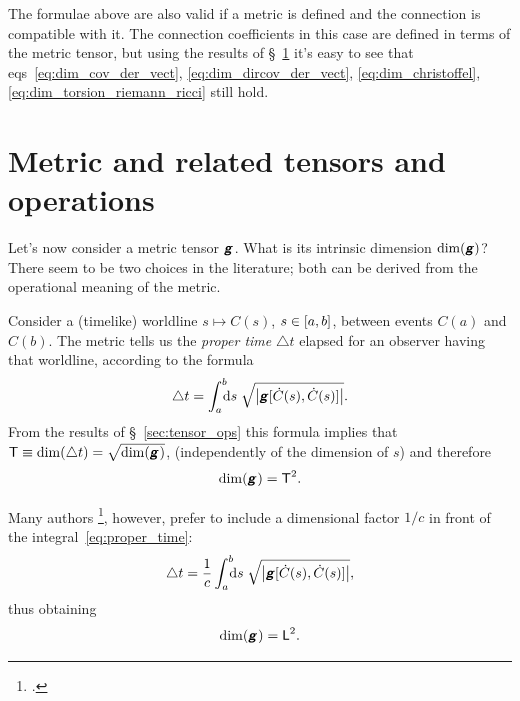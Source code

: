 \documentclass[\ifafour a4paper,12pt,\else a5paper,10pt,\fi%
onecolumn,oneside,article,%
british%
]{memoir}
\makeatletter
\theoremstyle{remark}
\theoremstyle{innote}
\newcommand*{\mathte}[1]{\textbf{\textit{\textsf{#1}}}}
\newcommand*{\citep}{\footcites}
\newcommand*{\di}{\mathrm{d}}%
\newcommand*{\incr}{\triangle}%
\DeclarePairedDelimiter\clcl{[}{]}
\DeclarePairedDelimiter\abs{\lvert}{\rvert}
\renewcommand*{\|}[1][]{\nonscript\,#1\vert\nonscript\;\mathopen{}}
\newcommand*{\sect}{\S}%
\newcommand*{\chap}{ch.}%
\newcommand*{\eqn}{eq.}%
\newcommand*{\eqns}{eqs}%
\newcommand*{\eg}{{e.g.}}
\newcommand*{\q}{}%
\DeclareRobustCommand*{\q}{%
  \mathbin{\mathpalette\bigcdot@{}}%
}
\newcommand*{\bigcdot@scalefactor}{0.75}
\newcommand*{\bigcdot@widthfactor}{1.5}
\newcommand*{\bigcdot@}[2]{%
  \sbox0{$#1\vcenter{}$}%
  \sbox2{$#1\cdot\m@th$}%
  \hbox to \bigcdot@widthfactor\wd2{%
    \hfil
    \raise\ht0\hbox{%
      \scalebox{\bigcdot@scalefactor}{%
        \lower\ht0\hbox{$#1\bullet\m@th$}%
      }%
    }%
    \hfil
  }%
}
\newcommand*{\Le}{\textsf{L}}
\newcommand*{\Ti}{\textsf{T}}
\newcommand*{\yg}{\mathte{g}}
\newcommand*{\ygc}{\mathte{g}}
\renewcommand*{\i}{\indices}
\newcommand*{\inct}{\incr t}
\makeatother
\begin{document}
\medskip

The formulae above are also valid if a metric is defined and the connection
is compatible with it. The connection coefficients in this case are defined
in terms of the metric tensor, but using the results of
\sect~\ref{sec:metric} it's easy to see that
\eqns~\eqref{eq:dim_cov_der_vect}, \eqref{eq:dim_dircov_der_vect},
\eqref{eq:dim_christoffel}, \eqref{eq:dim_torsion_riemann_ricci} still
hold.


\section{Metric and related tensors and operations}
\label{sec:metric}

Let's now consider a metric tensor $\yg\i{_{\q\q}}$. What is its intrinsic
dimension $\dim(\yg)$? There seem to be two choices in the literature; both
can be derived from the operational meaning of the metric.


Consider a (timelike) worldline $s \mapsto C(s)$, $s\in \clcl{a,b}$,
between events $C(a)$ and $C(b)$. The metric tells us the \emph{proper
  time} $\inct$ elapsed for an observer having that worldline, according to
the formula
\begin{equation}%
  \label{eq:proper_time}
\inct =  \int_a^b\!\!\!\di s\;
\sqrt{\abs*{\yg[\dot{C}(s),\dot{C}(s)]}}.
\end{equation}
From the results of \sect~\ref{sec:tensor_ops} this formula implies that
 $\Ti \equiv \dim(\inct) = \sqrt{\dim(\yg\i{_{\q\q}})}$,
(independently of the dimension of $s$) and therefore
\begin{equation}%
    \label{eq:dim_g}
    \dim(\yg\i{_{\q\q}}) = \Ti^{2}.
  \end{equation}

  Many authors \citep[\eg][\sect~V.62
  \eqn~(62.02)]{fock1955_t1964}[\chap~11
  \eqn~(11.21)]{curtisetal1985}[\sect~5.3
  \eqn~(5.6)]{rindler1969_r1986}[\chap~6 \eqn~(6.24)]{hartle2003}, however,
  prefer to include a dimensional factor $1/c$ in front of the
  integral~\eqref{eq:proper_time}:
\begin{equation}%
  \label{eq:proper_time_c}
  \inct = \frac{1}{c} \int_a^b\!\!\!\di s\;
  \sqrt{\abs*{\ygc[\dot{C}(s),\dot{C}(s)]}},
\end{equation}
thus obtaining
\begin{equation}%
  \label{eq:dim_g_c}
  \dim(\ygc\i{_{\q\q}}) = \Le^{2}.
\end{equation}
\end{document}
